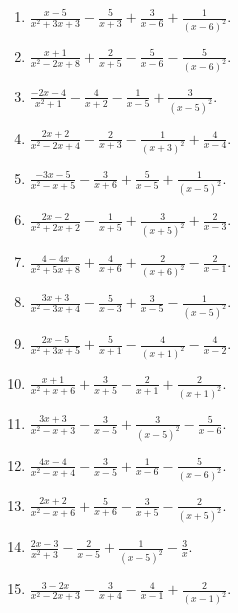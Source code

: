 \documentclass[11pt,oneside]{book}
\begin{document}
\begin{enumerate}[leftmargin=*,label=\textbf{AA\arabic*.},itemsep=0.45\baselineskip]
\item $\displaystyle \frac{x - 5}{x^{2} + 3 x + 3} - \frac{5}{x + 3} + \frac{3}{x - 6} + \frac{1}{\left(x - 6\right)^{2}}$.
\item $\displaystyle \frac{x + 1}{x^{2} - 2 x + 8} + \frac{2}{x + 5} - \frac{5}{x - 6} - \frac{5}{\left(x - 6\right)^{2}}$.
\item $\displaystyle \frac{- 2 x - 4}{x^{2} + 1} - \frac{4}{x + 2} - \frac{1}{x - 5} + \frac{3}{\left(x - 5\right)^{2}}$.
\item $\displaystyle \frac{2 x + 2}{x^{2} - 2 x + 4} - \frac{2}{x + 3} - \frac{1}{\left(x + 3\right)^{2}} + \frac{4}{x - 4}$.
\item $\displaystyle \frac{- 3 x - 5}{x^{2} - x + 5} - \frac{3}{x + 6} + \frac{5}{x - 5} + \frac{1}{\left(x - 5\right)^{2}}$.
\item $\displaystyle \frac{2 x - 2}{x^{2} + 2 x + 2} - \frac{1}{x + 5} + \frac{3}{\left(x + 5\right)^{2}} + \frac{2}{x - 3}$.
\item $\displaystyle \frac{4 - 4 x}{x^{2} + 5 x + 8} + \frac{4}{x + 6} + \frac{2}{\left(x + 6\right)^{2}} - \frac{2}{x - 1}$.
\item $\displaystyle \frac{3 x + 3}{x^{2} - 3 x + 4} - \frac{5}{x - 3} + \frac{3}{x - 5} - \frac{1}{\left(x - 5\right)^{2}}$.
\item $\displaystyle \frac{2 x - 5}{x^{2} + 3 x + 5} + \frac{5}{x + 1} - \frac{4}{\left(x + 1\right)^{2}} - \frac{4}{x - 2}$.
\item $\displaystyle \frac{x + 1}{x^{2} + x + 6} + \frac{3}{x + 5} - \frac{2}{x + 1} + \frac{2}{\left(x + 1\right)^{2}}$.
\item $\displaystyle \frac{3 x + 3}{x^{2} - x + 3} - \frac{3}{x - 5} + \frac{3}{\left(x - 5\right)^{2}} - \frac{5}{x - 6}$.
\item $\displaystyle \frac{4 x - 4}{x^{2} - x + 4} - \frac{3}{x - 5} + \frac{1}{x - 6} - \frac{5}{\left(x - 6\right)^{2}}$.
\item $\displaystyle \frac{2 x + 2}{x^{2} - x + 6} + \frac{5}{x + 6} - \frac{3}{x + 5} - \frac{2}{\left(x + 5\right)^{2}}$.
\item $\displaystyle \frac{2 x - 3}{x^{2} + 3} - \frac{2}{x - 5} + \frac{1}{\left(x - 5\right)^{2}} - \frac{3}{x}$.
\item $\displaystyle \frac{3 - 2 x}{x^{2} - 2 x + 3} - \frac{3}{x + 4} - \frac{4}{x - 1} + \frac{2}{\left(x - 1\right)^{2}}$.
\end{enumerate}
\end{document}
